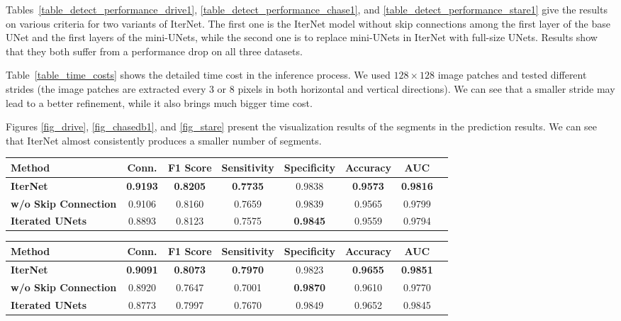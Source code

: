 \documentclass[10pt,twocolumn,letterpaper]{article}
\begin{document}
Tables~\ref{table_detect_performance_drive1}, \ref{table_detect_performance_chase1}, and \ref{table_detect_performance_stare1} give the results on various criteria for two variants of IterNet. The first one is the IterNet model without skip connections among the first layer of the base UNet and the first layers of the mini-UNets, while the second one is to replace mini-UNets in IterNet with full-size UNets. Results show that they both suffer from a performance drop on all three datasets.

Table~\ref{table_time_costs} shows the detailed time cost in the inference process. We used $128\times 128$ image patches and tested different strides (the image patches are extracted every 3 or 8 pixels in both horizontal and vertical directions). We can see that a smaller stride may lead to a better refinement, while it also brings much bigger time cost.

Figures \ref{fig_drive}, \ref{fig_chasedb1}, and \ref{fig_stare} present the visualization results of the segments in the prediction results. We can see that IterNet almost consistently produces a smaller number of segments. 


\newpage


\begin{table*}
	\caption{Performance comparison on the DRIVE dataset (with mask).}
	\label{table_detect_performance_drive1}
	\centering
	\begin{tabular}{l|ccccccc}
		\hline
		Method  & Conn. & F1 Score & Sensitivity & Specificity & Accuracy & AUC\\ 
		\hline
		
		\textbf{IterNet} & \textbf{0.9193} &\textbf{0.8205} & \textbf{0.7735} & 0.9838 &\textbf{0.9573}& \textbf{0.9816}\\
		\textbf{w/o Skip Connection} & 0.9106 & 0.8160 & 0.7659 &  0.9839& 0.9565& 0.9799\\
		\textbf{Iterated UNets } & 0.8893 & 0.8123 & 0.7575 & \textbf{0.9845} & 0.9559& 0.9794\\
		
		\hline
	\end{tabular}
\end{table*}

\begin{table*}
	\caption{Performance comparison on the CHASEDB1 dataset (with mask).}
	\label{table_detect_performance_chase1}
	\centering
	\begin{tabular}{l|ccccccc}
		\hline
		Method  & Conn. & F1 Score & Sensitivity & Specificity & Accuracy & AUC\\ 
		\hline
		
		\textbf{IterNet} & \textbf{0.9091} &  \textbf{0.8073} &  \textbf{0.7970} & 0.9823 & \textbf{0.9655} & \textbf{0.9851}\\
		\textbf{w/o Skip Connection} & 0.8920 & 0.7647 & 0.7001 & \textbf{0.9870} & 0.9610 & 0.9770\\
		\textbf{Iterated UNets } & 0.8773 & 0.7997 & 0.7670 & 0.9849 & 0.9652 & 0.9845\\
		
		\hline
	\end{tabular}
\end{table*}
\end{document}
